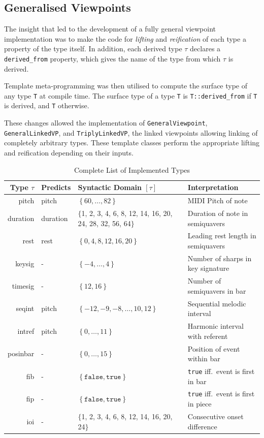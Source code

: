 \documentclass[12pt,a4paper,twoside,openright]{report}
\newcommand{\set}[1]{ \left\{ #1 \right\} }
\begin{document}
\subsection{Generalised Viewpoints}

The insight that led to the development of a fully general viewpoint
implementation was to make the code for \emph{lifting} and \emph{reification} of
each type a property of the type itself. In addition, each derived type $\tau$
declares a \texttt{derived\_from} property, which gives the name of the type
from which $\tau$ is derived. 

Template meta-programming was then utilised to compute the surface type of any
type \texttt{T} at compile time. The surface type of a type \texttt{T} is
\texttt{T::derived\_from} if \texttt{T} is derived, and \texttt{T} otherwise.

These changes allowed the implementation of \texttt{GeneralViewpoint},
\texttt{GeneralLinkedVP}, and \texttt{TriplyLinkedVP}, the linked viewpoints
allowing linking of completely arbitrary types. These template classes perform
the appropriate lifting and reification depending on their inputs.

\begin{table}[H]
  \begin{tabular}{ r | l | p{4.55cm} | p{6.5cm} }
    Type $\tau$ & Predicts & Syntactic Domain $[\tau]$ & Interpretation \\ \hline
    pitch & pitch & $\set{60,\ldots,82}$ & MIDI Pitch of note \\
    duration & duration & $\{$1, 2, 3, 4, 6, 8, 12, 14, 16, 20, 24, 28, 32, 56,
    64$\}$ &
    Duration of note in semiquavers \\
    rest & rest & $\set{0,4,8,12,16,20}$ & Leading rest length in semiquavers \\
    keysig & - & $\set{-4,\ldots,4}$ & Number of sharps in key signature \\
    timesig & - & $\set{12,16}$ & Number of semiquavers in bar \\ \hline
    seqint & pitch & $\set{-12,-9,-8,\ldots,10,12}$ & Sequential melodic interval \\
    intref & pitch & $\set{0,\ldots,11}$ & Harmonic interval with referent \\
    posinbar & - & $\set{0,\ldots,15}$ & Position of event within bar \\
    fib & - & $\set{\texttt{false}, \texttt{true}}$ & \texttt{true} iff.\ event is first in bar \\
    fip & - & $\set{\texttt{false}, \texttt{true}}$ & \texttt{true} iff.\ event is first in piece \\
    ioi & - & $\{$1, 2, 3, 4, 6, 8, 12, 14, 16, 20, 24$\}$ & Consecutive onset
    difference
  \end{tabular}
  \caption{Complete List of Implemented Types}
  \label{tab:mvs-types}
\end{table}
\end{document}
